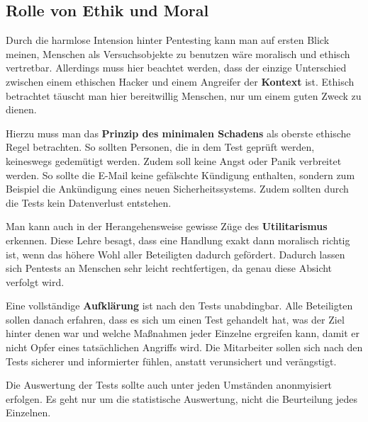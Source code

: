 \documentclass[12pt, a4paper, oneside]{scrartcl}
\begin{document}
\subsection{Rolle von Ethik und Moral}
Durch die harmlose Intension hinter Pentesting kann man auf ersten Blick meinen, Menschen als Versuchsobjekte
zu benutzen wäre moralisch und ethisch vertretbar. Allerdings muss hier beachtet werden, dass der 
einzige Unterschied zwischen einem ethischen Hacker und einem Angreifer der \textbf{Kontext} ist.
Ethisch betrachtet täuscht man hier bereitwillig Menschen, nur um einem guten Zweck zu dienen. 
\par
Hierzu muss man das \textbf{Prinzip des minimalen Schadens} als oberste ethische Regel betrachten. So sollten
Personen, die in dem Test geprüft werden, keineswegs gedemütigt werden. Zudem soll keine Angst oder Panik
verbreitet werden. So sollte die E-Mail keine gefälschte Kündigung enthalten, sondern zum Beispiel die 
Ankündigung eines neuen Sicherheitssystems. Zudem sollten durch die Tests kein Datenverlust entstehen.
\par
Man kann auch in der Herangehensweise gewisse Züge des \textbf{Utilitarismus} erkennen. Diese Lehre besagt,
dass eine Handlung exakt dann moralisch richtig ist, wenn das höhere Wohl aller Beteiligten dadurch gefördert.
Dadurch lassen sich Pentests an Menschen sehr leicht rechtfertigen, da genau diese Absicht verfolgt wird.
\par
Eine vollständige \textbf{Aufklärung} ist nach den Tests unabdingbar. Alle Beteiligten sollen danach
erfahren, dass es sich um einen Test gehandelt hat, was der Ziel hinter denen war und welche Maßnahmen
jeder Einzelne ergreifen kann, damit er nicht Opfer eines tatsächlichen Angriffs wird.
Die Mitarbeiter sollen sich nach den Tests sicherer und informierter fühlen, anstatt verunsichert und 
verängstigt.
\par
Die Auswertung der Tests sollte auch unter jeden Umständen anonmyisiert erfolgen. Es geht nur um
die statistische Auswertung, nicht die Beurteilung jedes Einzelnen. 
\end{document}
